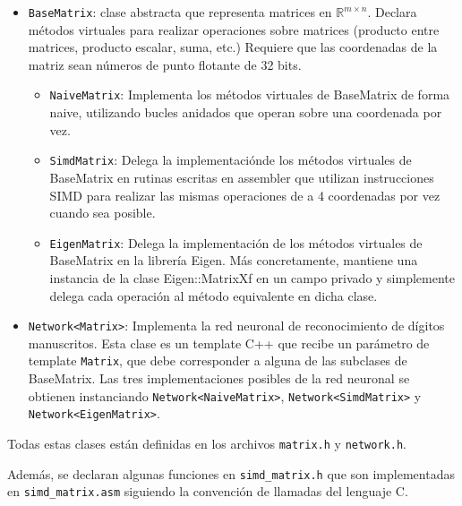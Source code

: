 \documentclass[a4paper, 10pt, twoside]{article}
\newcommand{\cc}[1]{\texttt{#1}}
\begin{document}
\begin{itemize}
  \item \cc{BaseMatrix}: clase abstracta que representa matrices en
    $\mathbb{R}^{m \times n}$. Declara métodos virtuales para realizar
    operaciones sobre matrices (producto entre matrices, producto escalar,
    suma, etc.) Requiere que las coordenadas de la matriz sean números de punto
    flotante de 32 bits.

  \begin{itemize}
    \item \cc{NaiveMatrix}: Implementa los métodos virtuales de BaseMatrix de
      forma naive, utilizando bucles anidados que operan sobre una coordenada
      por vez.

    \item \cc{SimdMatrix}: Delega la implementaciónde los métodos virtuales de
      BaseMatrix en rutinas escritas en assembler que utilizan instrucciones
      SIMD para realizar las mismas operaciones de a 4 coordenadas por vez
      cuando sea posible.

    \item \cc{EigenMatrix}: Delega la implementación de los métodos virtuales
      de BaseMatrix en la librería Eigen. Más concretamente, mantiene una
      instancia de la clase Eigen::MatrixXf en un campo privado y simplemente
      delega cada operación al método equivalente en dicha clase.
  \end{itemize}

  \item \cc{Network<Matrix>}: Implementa la red neuronal de reconocimiento de
    dígitos manuscritos. Esta clase es un template C++ que recibe un parámetro
    de template \cc{Matrix}, que debe corresponder a alguna de las subclases de
    BaseMatrix. Las tres implementaciones posibles de la red neuronal se
    obtienen instanciando \cc{Network<NaiveMatrix>}, \cc{Network<SimdMatrix>} y
    \cc{Network<EigenMatrix>}.
\end{itemize}

Todas estas clases están definidas en los archivos \cc{matrix.h} y
\cc{network.h}.

Además, se declaran algunas funciones en \cc{simd\_matrix.h} que son
implementadas en \cc{simd\_matrix.asm} siguiendo la convención de llamadas del
lenguaje C.


\end{document}
